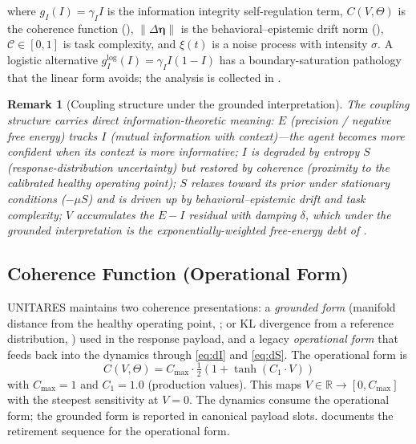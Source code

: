 \documentclass[11pt,twocolumn]{article}
\newtheorem{remark}[theorem]{Remark}
\newcommand{\R}{\mathbb{R}}
\newcommand{\norm}[1]{\left\lVert #1 \right\rVert}
\newcommand{\deta}{\ensuremath{\Delta\bm{\eta}}}
\newcommand{\cv}{\ensuremath{C(V,\Theta)}}
\begin{document}
where $g_I(I) = \gamma_I I$ is the information integrity
self-regulation term, $\cv$ is the coherence function
(), $\norm{\deta}$ is the
behavioral--epistemic drift norm (),
$\mathcal{C} \in [0,1]$ is task complexity, and $\xi(t)$ is a
noise process with intensity $\sigma$. A logistic alternative
$g_I^{\log}(I) = \gamma_I I(1-I)$ has a boundary-saturation
pathology that the linear form avoids; the analysis is collected
in .

\begin{remark}[Coupling structure under the grounded interpretation]
The coupling structure carries direct information-theoretic
meaning: $E$ (precision / negative free energy) tracks $I$
(mutual information with context)---the agent becomes more
confident when its context is more informative; $I$ is degraded
by entropy $S$ (response-distribution uncertainty) but restored
by coherence (proximity to the calibrated healthy operating
point); $S$ relaxes toward its prior under stationary conditions
($-\mu S$) and is driven up by behavioral--epistemic drift and task complexity;
$V$ accumulates the $E{-}I$ residual with damping $\delta$, which
under the grounded interpretation is the exponentially-weighted
free-energy debt of .
\end{remark}

\subsection{Coherence Function (Operational Form)}
\label{sec:coherence}

UNITARES maintains two coherence presentations: a
\emph{grounded form} (manifold distance from the healthy
operating point, ; or KL divergence from a
reference distribution, ) used in the response
payload, and a legacy \emph{operational form} that feeds back
into the dynamics through \eqref{eq:dI} and \eqref{eq:dS}. The
operational form is
\begin{equation}
  \cv = C_{\max} \cdot \tfrac{1}{2}\left(1 + \tanh(C_1 \cdot V)\right)
  \label{eq:coherence}
\end{equation}
with $C_{\max} = 1$ and $C_1 = 1.0$ (production values). This
maps $V \in \R \to [0, C_{\max}]$ with the steepest sensitivity
at $V = 0$. The dynamics consume the operational form; the
grounded form is reported in canonical payload slots.
 documents the retirement sequence for the
operational form.
\end{document}
